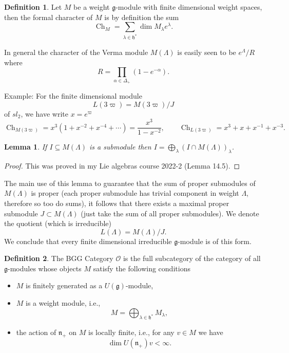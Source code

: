 \documentclass[12pt]{article}
\theoremstyle{plain}
\newtheorem{lemma}[thm]{Lemma}
\theoremstyle{definition}
\newtheorem{defn}{Definition}[section]
\numberwithin{equation}{section}
\DeclareMathOperator{\ch}{Ch}
\newcommand{\al}{\alpha}
\newcommand{\la}{\lambda}
\newcommand{\La}{\Lambda}
\newcommand{\D}{\Delta}
\newcommand{\g}{\mathfrak{g}}
\newcommand{\h}{\mathfrak{h}}
\newcommand{\n}{\mathfrak{n}}
\newcommand{\OO}{\mathcal{O}}
\begin{document}
\begin{defn}
Let $M$ be a weight $\g$-module with finite dimensional weight spaces, then the formal character of $M$ is by definition the sum
\[
\ch_M = \sum_{\lambda \in \h^*} \dim M_\la e^\la.
\]
\end{defn}

In general the character of the Verma module $M(\La)$ is easily seen to be $e^\La / R$ where
\[
R = \prod_{\al \in \D_+} (1 - e^{-\al}).
\]

Example: For the finite dimensional module
\[
L(3\varpi) = M(3\varpi) / J
\]
of $sl_2$, we have write $x = e^\varpi$
\[
\ch_{M(3\varpi)} = x^3(1 + x^{-2} + x^{-4} + \cdots) = \frac{x^3}{1-x^{-2}}, \qquad \ch_{L(3\varpi)} = x^3 + x + x^{-1} + x^{-3}.
\]



\begin{lemma}
If $I \subseteq M(\La)$ is a submodule then $I = \bigoplus_\la (I \cap M(\La))_\la$.
\end{lemma}

\begin{proof}
This was proved in my Lie algebras course 2022-2 (Lemma 14.5).
\end{proof}

The main use of this lemma to guarantee that the sum of proper submodules of $M(\Lambda)$ is proper (each proper submodule has trivial component in weight $\Lambda$, therefore so too do sums), it follows that there exists a maximal proper submodule $J \subset M(\Lambda)$ (just take the sum of all proper submodules). We denote the quotient (which is irreducible)
\[
L(\La) = M(\La) / J.
\]
We conclude that every finite dimensional irreducible $\g$-module is of this form.

\begin{defn}
The BGG Category $\OO$ is the full subcategory of the category of all $\g$-modules whose objects $M$ satisfy the following conditions
\begin{itemize}
\item $M$ is finitely generated as a $U(\g)$-module,

\item $M$ is a weight module, i.e.,
\[
M = \bigoplus_{\la \in \h^*} M_\la,
\]

\item the action of $\n_+$ on $M$ is locally finite, i.e., for any $v \in M$ we have
\[
\dim U(\n_+) v < \infty.
\]
\end{itemize}
\end{defn}
\end{document}
